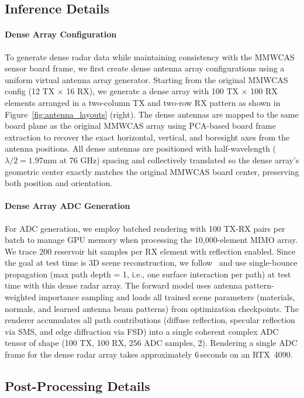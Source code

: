 \subsection{Inference Details}
\label{sec:supp_inference}

\paragraph{Dense Array Configuration}
To generate dense radar data while maintaining consistency with the MMWCAS sensor board frame, we first create dense antenna array configurations using a uniform virtual antenna array generator. Starting from the original MMWCAS config (12 TX × 16 RX), we generate a dense array with 100 TX $\times$ 100 RX elements arranged in a two-column TX and two-row RX pattern as shown in Figure~\ref{fig:antenna_layouts} (right). The dense antennas are mapped to the same board plane as the original MMWCAS array using PCA-based board frame extraction to recover the exact horizontal, vertical, and boresight axes from the antenna positions. All dense antennas are positioned with half-wavelength ($\lambda /2 = 1.97 $mm at 76 GHz) spacing and collectively translated so the dense array's geometric center exactly matches the original MMWCAS board center, preserving both position and orientation. 
\paragraph{Dense Array ADC Generation}
For ADC generation, we employ batched rendering with 100 TX-RX pairs per batch to manage GPU memory when processing the 10,000-element MIMO array. We trace 200 reservoir hit samples per RX element with reflection enabled. Since the goal at test time is 3D scene reconstruction, we follow~\cite{kung2025radarsplat} and use single-bounce propagation (max path depth = 1, i.e., one surface interaction per path) at test time with this dense radar array. The forward model uses antenna pattern-weighted importance sampling and loads all trained scene parameters (materials, normals, and learned antenna beam patterns) from optimization checkpoints. The renderer accumulates all path contributions (diffuse reflection, specular reflection via SMS, and edge diffraction via FSD) into a single coherent complex ADC tensor of shape (100 TX, 100 RX, 256 ADC samples, 2). Rendering a single ADC frame for the dense radar array takes approximately 6\,seconds on an RTX~4090.


\subsection{Post-Processing Details}
\label{sec:supp_postprocess}

